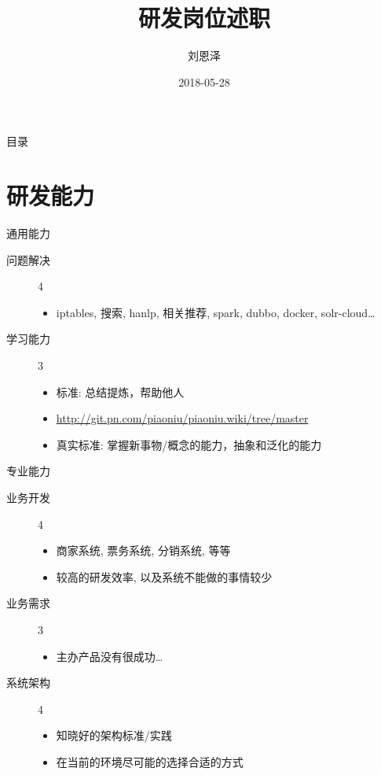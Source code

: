 \documentclass[presentation, bigger]{beamer}
\author{刘恩泽}
\date{2018-05-28}
\title{研发岗位述职}
\begin{document}
\maketitle
\begin{frame}{目录}
\tableofcontents
\end{frame}


\section{研发能力}
\label{sec:org0f6b115}
\begin{frame}[label={sec:org22c5dfb}]{通用能力}
\begin{description}
\item[{问题解决}] 4
\begin{itemize}
\item iptables, 搜索, hanlp, 相关推荐, spark, dubbo, docker, solr-cloud\ldots{}
\end{itemize}
\item[{学习能力}] 3
\begin{itemize}
\item 标准: 总结提炼，帮助他人
\item \url{http://git.pn.com/piaoniu/piaoniu.wiki/tree/master}
\item 真实标准: 掌握新事物/概念的能力，抽象和泛化的能力
\end{itemize}
\end{description}
\end{frame}

\begin{frame}[label={sec:org3a8d937}]{专业能力}
\begin{description}
\item[{业务开发}] 4
\begin{itemize}
\item 商家系统, 票务系统, 分销系统, 等等
\item 较高的研发效率, 以及系统不能做的事情较少
\end{itemize}
\item[{业务需求}] 3
\begin{itemize}
\item 主办产品没有很成功\ldots{}
\end{itemize}
\item[{系统架构}] 4
\begin{itemize}
\item 知晓好的架构标准/实践
\item 在当前的环境尽可能的选择合适的方式
\end{itemize}
\end{description}
\end{frame}
\end{document}
